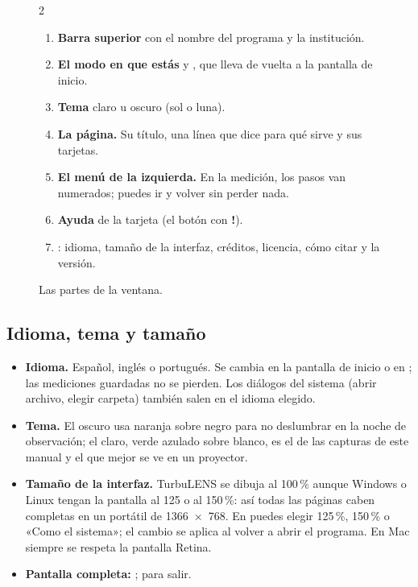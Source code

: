 \begin{figure}[H]
\caption{Las partes de la ventana.}\label{fig:ventana}
\vspace{-0.3em}\small\RaggedRight
\begin{multicols}{2}\begin{enumerate}[label=\marcanum{\arabic*},leftmargin=*,labelsep=0.5em,itemsep=0.25em]
\item \textbf{Barra superior} con el nombre del programa y la institución.
\item \textbf{El modo en que estás} y , que lleva de vuelta a la pantalla de inicio.
\item \textbf{Tema} claro u oscuro (sol o luna).
\item \textbf{La página.} Su título, una línea que dice para qué sirve y sus tarjetas.
\item \textbf{El menú de la izquierda.} En la medición, los pasos van numerados; puedes ir y volver sin perder nada.
\item \textbf{Ayuda} de la tarjeta (el botón con \textbf{!}).
\item {}: idioma, tamaño de la interfaz, créditos, licencia, cómo citar y la versión.
\end{enumerate}\end{multicols}
\end{figure}

\subsection*{Idioma, tema y tamaño}

\begin{itemize}
\item \textbf{Idioma.} Español, inglés o portugués. Se cambia en la pantalla de inicio o en ; las
mediciones guardadas no se pierden. Los diálogos del sistema (abrir archivo, elegir carpeta) también salen en el
idioma elegido.
\item \textbf{Tema.} El oscuro usa naranja sobre negro para no deslumbrar en la noche de observación; el claro, verde
azulado sobre blanco, es el de las capturas de este manual y el que mejor se ve en un proyector.
\item \textbf{Tamaño de la interfaz.} TurbuLENS se dibuja al 100\,\% aunque Windows o Linux tengan la pantalla al 125 o
al 150\,\%: así todas las páginas caben completas en un portátil de 1366~×~768. En  puedes elegir
125\,\%, 150\,\% o «Como el sistema»; el cambio se aplica al volver a abrir el programa. En Mac siempre se respeta la
pantalla Retina.
\item \textbf{Pantalla completa:} ;  para salir.
\end{itemize}

